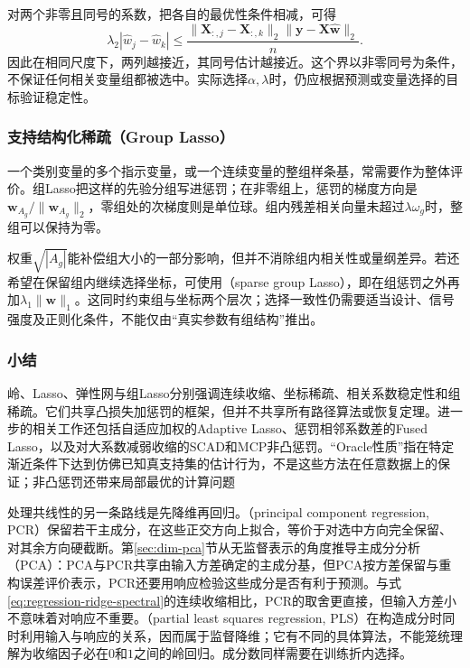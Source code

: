 对两个非零且同号的系数，把各自的最优性条件相减，可得
\[
  \lambda_2|\widehat w_j-\widehat w_k|
  \leq\frac{\lVert\bm{X}_{:,j}-\bm{X}_{:,k}\rVert_2
                  \lVert\bm{y}-\bm{X}\widehat{\bm{w}}\rVert_2}{n}.
\]
因此在相同尺度下，两列越接近，其同号估计越接近。这个界以非零同号为条件，不保证任何相关变量组都被选中。实际选择$\alpha,\lambda$时，仍应根据预测或变量选择的目标验证稳定性。

\subsubsection{支持结构化稀疏（Group Lasso）}
\label{sec:regression-group-lasso}

一个类别变量的多个指示变量，或一个连续变量的整组样条基，常需要作为整体评价。组Lasso把这样的先验分组写进惩罚；在非零组上，惩罚的梯度方向是$\bm{w}_{A_g}/\lVert\bm{w}_{A_g}\rVert_2$，零组处的次梯度则是单位球。组内残差相关向量未超过$\lambda\omega_g$时，整组可以保持为零。

权重$\sqrt{|A_g|}$能补偿组大小的一部分影响，但并不消除组内相关性或量纲差异。若还希望在保留组内继续选择坐标，可使用（sparse group Lasso），即在组惩罚之外再加$\lambda_1\lVert\bm{w}\rVert_1$。这同时约束组与坐标两个层次；选择一致性仍需要适当设计、信号强度及正则化条件，不能仅由“真实参数有组结构”推出。

\subsubsection{小结}
\label{sec:regression-regularization-summary}

岭、Lasso、弹性网与组Lasso分别强调连续收缩、坐标稀疏、相关系数稳定性和组稀疏。它们共享凸损失加惩罚的框架，但并不共享所有路径算法或恢复定理。进一步的相关工作还包括自适应加权的Adaptive Lasso、惩罚相邻系数差的Fused Lasso，以及对大系数减弱收缩的SCAD和MCP非凸惩罚。“Oracle性质”指在特定渐近条件下达到仿佛已知真支持集的估计行为，不是这些方法在任意数据上的保证；非凸惩罚还带来局部最优的计算问题

处理共线性的另一条路线是先降维再回归。（principal component regression, PCR）保留若干主成分，在这些正交方向上拟合，等价于对选中方向完全保留、对其余方向硬截断。第\ref{sec:dim-pca}节从无监督表示的角度推导主成分分析（PCA）：PCA与PCR共享由输入方差确定的主成分基，但PCA按方差保留与重构误差评价表示，PCR还要用响应检验这些成分是否有利于预测。与式\eqref{eq:regression-ridge-spectral}的连续收缩相比，PCR的取舍更直接，但输入方差小不意味着对响应不重要。（partial least squares regression, PLS）在构造成分时同时利用输入与响应的关系，因而属于监督降维；它有不同的具体算法，不能笼统理解为收缩因子必在$0$和$1$之间的岭回归。成分数同样需要在训练折内选择。

